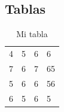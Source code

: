 \subsection{Tablas}

\begin{table}
    \centering
    \caption{Mi tabla}
    \begin{tabular}{lll|l} 
    \cline{1-1}
    \multicolumn{1}{|l|}{4} & 5                      & \multicolumn{1}{l}{6} & 6                        \\ 
    \cline{1-3}
    \multicolumn{1}{l|}{7}  & \multicolumn{1}{l|}{6} & 7                     & 65                       \\ 
    \cline{2-4}
    5                       & 6                      & 6                     & \multicolumn{1}{l|}{56}  \\ 
    \cline{4-4}
    6                       & 5                      & \multicolumn{1}{l}{6} & 5                       
    \end{tabular}
    \end{table}